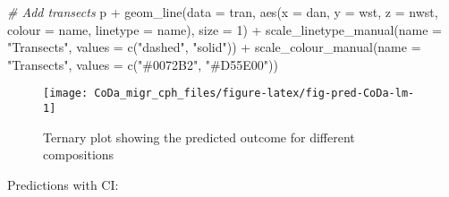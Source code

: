 \documentclass[
  12pt,
]{article}
\newenvironment{Shaded}{\begin{snugshade}}{\end{snugshade}}
\newcommand{\AttributeTok}[1]{\textcolor[rgb]{0.77,0.63,0.00}{#1}}
\newcommand{\CommentTok}[1]{\textcolor[rgb]{0.56,0.35,0.01}{\textit{#1}}}
\newcommand{\DecValTok}[1]{\textcolor[rgb]{0.00,0.00,0.81}{#1}}
\newcommand{\FunctionTok}[1]{\textcolor[rgb]{0.00,0.00,0.00}{#1}}
\newcommand{\NormalTok}[1]{#1}
\newcommand{\SpecialCharTok}[1]{\textcolor[rgb]{0.00,0.00,0.00}{#1}}
\newcommand{\StringTok}[1]{\textcolor[rgb]{0.31,0.60,0.02}{#1}}
\begin{document}
\begin{Shaded}
\begin{Highlighting}[]
\CommentTok{\# Add transects}
\NormalTok{p }\SpecialCharTok{+} \FunctionTok{geom\_line}\NormalTok{(}\AttributeTok{data =}\NormalTok{ tran,}
              \FunctionTok{aes}\NormalTok{(}\AttributeTok{x =}\NormalTok{ dan,}
                  \AttributeTok{y =}\NormalTok{ wst,}
                  \AttributeTok{z =}\NormalTok{ nwst,}
                  \AttributeTok{colour =}\NormalTok{ name,}
                  \AttributeTok{linetype =}\NormalTok{ name),}
              \AttributeTok{size =} \DecValTok{1}\NormalTok{) }\SpecialCharTok{+}
  \FunctionTok{scale\_linetype\_manual}\NormalTok{(}\AttributeTok{name =} \StringTok{"Transects"}\NormalTok{,}
                        \AttributeTok{values =} \FunctionTok{c}\NormalTok{(}\StringTok{"dashed"}\NormalTok{, }\StringTok{"solid"}\NormalTok{)) }\SpecialCharTok{+}
  \FunctionTok{scale\_colour\_manual}\NormalTok{(}\AttributeTok{name =} \StringTok{"Transects"}\NormalTok{,}
                      \AttributeTok{values =} \FunctionTok{c}\NormalTok{(}\StringTok{"\#0072B2"}\NormalTok{, }\StringTok{"\#D55E00"}\NormalTok{)) }
\end{Highlighting}
\end{Shaded}

\begin{figure}[H]

{\centering \texttt{[image: CoDa\_migr\_cph\_files/figure-latex/fig-pred-CoDa-lm-1]} 

}

\caption{Ternary plot showing the predicted outcome for different compositions}\label{fig:fig-pred-CoDa-lm}
\end{figure}

Predictions with CI:
\end{document}
